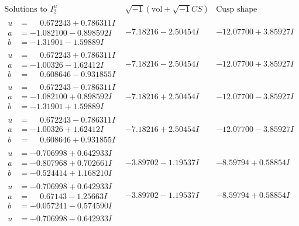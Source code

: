 \documentclass[1p]{elsarticle_modified}
\theoremstyle{definition}
\newcommand{\I}{\sqrt{-1}}
\begin{document}
$$\begin{array}{c|c|c}  
\text{Solutions to }I^u_{2}& \I (\text{vol} + \sqrt{-1}CS) & \text{Cusp shape}\\
 \hline 
\begin{aligned}
u &= \phantom{-}0.672243 + 0.786311 I \\
a &= -1.082100 - 0.898592 I \\
b &= -1.31901 - 1.59889 I\end{aligned}
 & -7.18216 - 2.50454 I & -12.07700 + 3.85927 I \\ \hline\begin{aligned}
u &= \phantom{-}0.672243 + 0.786311 I \\
a &= -1.00326 - 1.62412 I \\
b &= \phantom{-}0.608646 - 0.931855 I\end{aligned}
 & -7.18216 - 2.50454 I & -12.07700 + 3.85927 I \\ \hline\begin{aligned}
u &= \phantom{-}0.672243 - 0.786311 I \\
a &= -1.082100 + 0.898592 I \\
b &= -1.31901 + 1.59889 I\end{aligned}
 & -7.18216 + 2.50454 I & -12.07700 - 3.85927 I \\ \hline\begin{aligned}
u &= \phantom{-}0.672243 - 0.786311 I \\
a &= -1.00326 + 1.62412 I \\
b &= \phantom{-}0.608646 + 0.931855 I\end{aligned}
 & -7.18216 + 2.50454 I & -12.07700 - 3.85927 I \\ \hline\begin{aligned}
u &= -0.706998 + 0.642933 I \\
a &= -0.807968 + 0.702661 I \\
b &= -0.524414 + 1.168210 I\end{aligned}
 & -3.89702 - 1.19537 I & -8.59794 + 0.58854 I \\ \hline\begin{aligned}
u &= -0.706998 + 0.642933 I \\
a &= \phantom{-}0.67143 - 1.25663 I \\
b &= -0.057241 - 0.574590 I\end{aligned}
 & -3.89702 - 1.19537 I & -8.59794 + 0.58854 I \\ \hline\begin{aligned}
u &= -0.706998 - 0.642933 I \\

\end{aligned}
\end{array}$$
\end{document}
